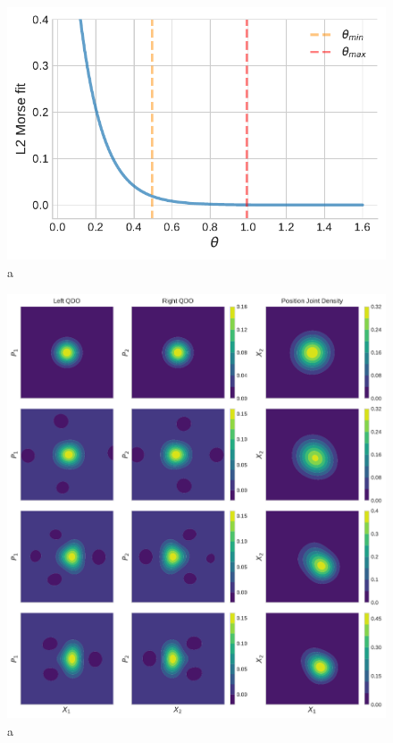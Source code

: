 \documentclass[reprint, amsmath, amssymb, aps]{revtex4-2}
\begin{document}
    \begin{figure}
    \label{fig:morse_quality}
        \includegraphics[scale=0.75]{figures/morse_quality.pdf}
        \caption{a}
    \end{figure}

    \begin{figure}
    \label{fig:wigners_joint}
        \includegraphics[scale=0.8]{figures/wigners_joint.pdf}
        \caption{a}
    \end{figure}
\end{document}
